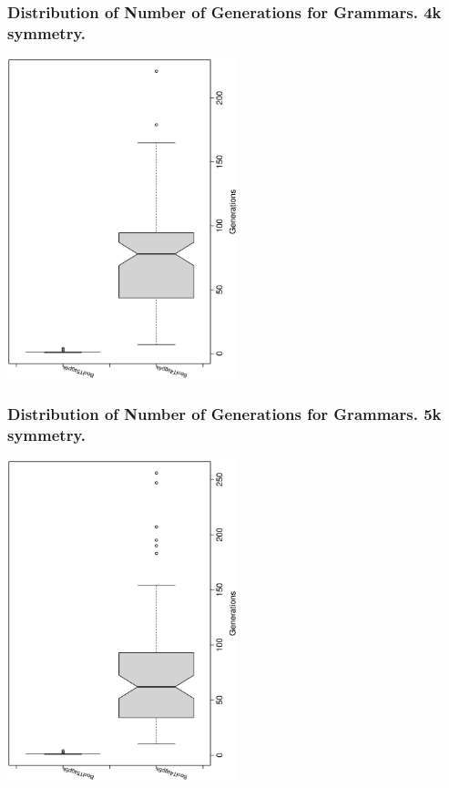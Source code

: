 \documentclass[18pt,c]{beamer}
\begin{document}
 \begin{frame}
 \frametitle{ Distribution of Number of Generations for Grammars. 4k  symmetry. }
 \begin{center}
\includegraphics[width=0.5\textwidth, angle=-90]
{ExpEboxplottGenerations002.eps}
 \end{center}
 \label{ExpEboxplottGenerations002.eps}  
 \end{frame}

 \begin{frame}
 \frametitle{ Distribution of Number of Generations for Grammars. 5k  symmetry. }
 \begin{center}
\includegraphics[width=0.5\textwidth, angle=-90]
{ExpEboxplottGenerations003.eps}
 \end{center}
 \label{ExpEboxplottGenerations003.eps}  
 \end{frame}
\end{document}
